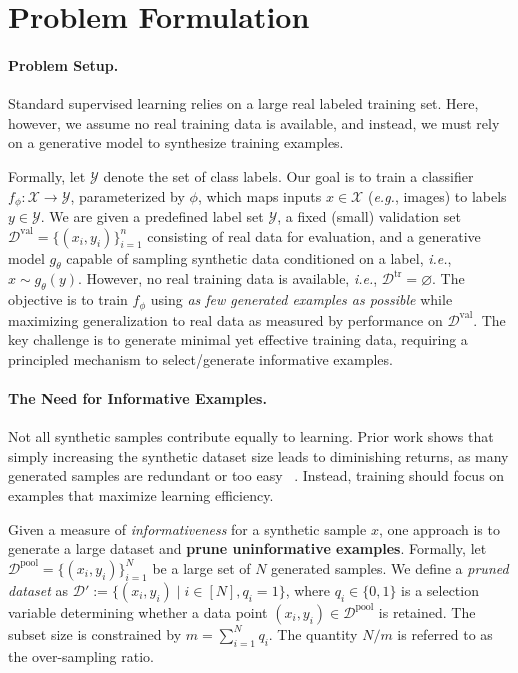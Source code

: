 \section{Problem Formulation}
\label{sec:2}

\paragraph{Problem Setup.} 
Standard supervised learning relies on a large real labeled training set. Here, however, we assume no real training data is available, and instead, we must rely on a generative model to synthesize training examples.

Formally, let \( \mathcal{Y} \) denote the set of class labels. Our goal is to train a classifier \( f_\phi: \mathcal{X} \to \mathcal{Y} \), parameterized by \( \phi \), which maps inputs \( x \in \mathcal{X} \) (\textit{e.g.}, images) to labels \( y \in \mathcal{Y} \). We are given a predefined label set \( \mathcal{Y} \), a fixed (small) validation set \( \mathcal{D}^{\text{val}} = \{(x_i, y_i)\}_{i=1}^n \) consisting of real data for evaluation, and a generative model \( g_\theta \) capable of sampling synthetic data conditioned on a label, \textit{i.e.}, \( x \sim g_\theta(y) \). However, no real training data is available, \textit{i.e.}, \( \mathcal{D}^{\text{tr}} = \varnothing \). The objective is to train \( f_\phi \) using \emph{as few generated examples as possible} while maximizing generalization to real data as measured by performance on \( \mathcal{D}^{\text{val}} \). The key challenge is to generate minimal yet effective training data, requiring a principled mechanism to select/generate  informative examples.

\paragraph{The Need for Informative Examples.}

Not all synthetic samples contribute equally to learning. Prior work shows that simply increasing the synthetic dataset size leads to diminishing returns, as many generated samples are redundant or too easy ~\citep{fan2024scaling}. Instead, training should focus on examples that maximize learning efficiency.

Given a measure of \textit{informativeness} for a synthetic sample \( x \), one approach is to generate a large dataset and \textbf{prune uninformative examples}. Formally, let \( \mathcal{D}^{\text{pool}} = \{(x_i, y_i)\}_{i=1}^N \) be a large set of $N$ generated samples. We define a \emph{pruned dataset} as $\mathcal{D}' := \{(x_i, y_i) \mid i \in [N], q_i = 1\}$, where $q_i \in \{0,1\}$ is a selection variable determining whether a data point $(x_i, y_i) \in \mathcal{D}^{\text{pool}}$ is retained. The subset size is constrained by \( m = \sum_{i=1}^N q_i \). The quantity $N / m$ is referred to as the over-sampling ratio.

